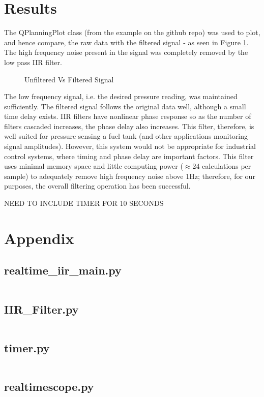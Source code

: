 \documentclass{article}
\begin{document}
\section{Results}
The QPlanningPlot class (from the example on the github repo) was used to plot, and hence compare, the raw data with the filtered signal - as seen in Figure \ref{fig:filtered}. The high frequency noise present in the signal was completely removed by the low pass IIR filter. 
\begin{figure}[H]
    \centering
    
    \caption{Unfiltered Vs Filtered Signal}
    \label{fig:filtered}
\end{figure}
The low frequency signal, i.e. the desired pressure reading, was maintained sufficiently. The filtered signal follows the original data well, although a small time delay exists. IIR filters have nonlinear phase response so as the number of filters cascaded increases, the phase delay also increases. This filter, therefore, is well suited for pressure sensing a fuel tank (and other applications monitoring signal amplitudes). However, this system would not be appropriate for industrial control systems, where timing and phase delay are important factors.\newline
This filter uses minimal memory space and little computing power ($\approx$24 calculations per sample) to adequately remove high frequency noise above 1Hz; therefore, for our purposes, the overall filtering operation has been successful. 


\pagebreak NEED TO INCLUDE TIMER FOR 10 SECONDS
\section{Appendix}
\subsection{realtime\_iir\_main.py}
\inputminted{python}{realtime_iir_main.py}

\pagebreak
\subsection{IIR\_Filter.py}
\inputminted{python}{IIR_filter.py}

\pagebreak
\subsection{timer.py}
\inputminted{python}{timer.py}

\pagebreak
\subsection{realtimescope.py}
\inputminted{python}{realtimescope.py}
\end{document}
